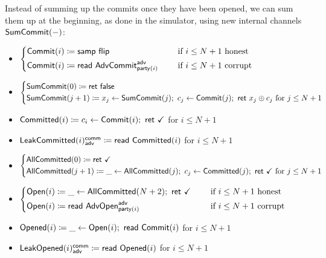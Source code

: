 \noindent Instead of summing up the commits once they have been opened, we can sum them up at the beginning, as done in the simulator, using new internal channels $\mathsf{SumCommit}(-)$:

\begin{itemize}
\item {\color{blue} $\begin{cases*} \Commit(i) \coloneqq \samp{\flip} & \hspace{10pt} \text{if $i \leq N+1$ honest} \\ \Commit(i) \coloneqq \read{\AdvCommit^\adv_{\party(i)}} & \hspace{10pt} \text{if $i \leq N+1$ corrupt} \end{cases*}$}
\item {\color{blue} $\begin{cases*} \SumCommit(0) \coloneqq \ret{\false} \\ \SumCommit(j+1) \coloneqq x_j \leftarrow \SumCommit(j); \ c_j \leftarrow \Commit(j); \ \ret{x_j \oplus c_j} \text{ for $j \leq N+1$} \end{cases*}$}
\item {\color{magenta} $\mathsf{Committed}(i) \coloneqq c_i \leftarrow \mathsf{Commit}(i); \ \mathsf{ret} \ \checkmark$ for $i \leq N+1$}
\item {\color{magenta} $\mathsf{LeakCommitted}(i)^{\mathsf{comm}}_{\mathsf{adv}} \coloneqq \mathsf{read} \ \mathsf{Committed}(i)$ for $i \leq N+1$}
\item {\color{magenta} $\begin{cases*} \AllCommitted(0) \coloneqq \ret{\checkmark} \\ \AllCommitted(j+1) \coloneqq \_ \leftarrow \AllCommitted(j); \ c_j \leftarrow \Committed(j); \ \ret{\checkmark} \text{ for $j \leq N+1$} \end{cases*}$}
\item {\color{teal} $\begin{cases*} \Open(i) \coloneqq \_ \leftarrow \AllCommitted(N+2); \ \ret{\checkmark} & \hspace{10pt} \text{if $i \leq N+1$ honest} \\ \Open(i) \coloneqq \read{\AdvOpen^\adv_{\party(i)}} & \hspace{10pt} \text{if $i \leq N+1$ corrupt} \end{cases*}$}
\item {\color{red} $\mathsf{Opened}(i) \coloneqq \_ \leftarrow \mathsf{Open}(i); \ \mathsf{read} \ \mathsf{Commit}(i)$ for $i \leq N+1$}
\item {\color{red} $\mathsf{LeakOpened}(i)^{\mathsf{comm}}_{\mathsf{adv}} \coloneqq \mathsf{read} \ \mathsf{Opened}(i)$ for $i \leq N+1$}

\end{itemize}
